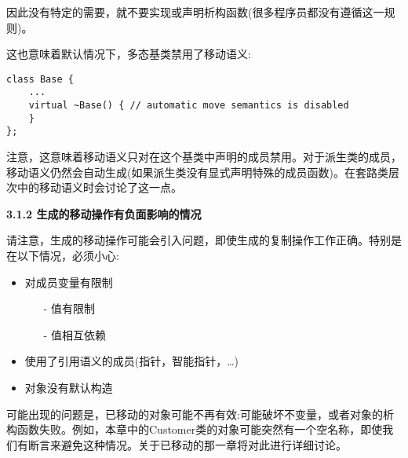 因此没有特定的需要，就不要实现或声明析构函数(很多程序员都没有遵循这一规则)。\par

这也意味着默认情况下，多态基类禁用了移动语义:\par

\begin{lstlisting}[caption={}]
class Base {
	...
	virtual ~Base() { // automatic move semantics is disabled
	}
};
\end{lstlisting}

注意，这意味着移动语义只对在这个基类中声明的成员禁用。对于派生类的成员，移动语义仍然会自动生成(如果派生类没有显式声明特殊的成员函数)。在套路类层次中的移动语义时会讨论了这一点。\par

\hspace*{\fill} \par %
\textbf{3.1.2 生成的移动操作有负面影响的情况}

请注意，生成的移动操作可能会引入问题，即使生成的复制操作工作正确。特别是在以下情况，必须小心:\par

\begin{itemize}
	\item 对成员变量有限制
	\begin{itemize}
		\item[-] 值有限制
		\item[-] 值相互依赖
	\end{itemize}
	\item 使用了引用语义的成员(指针，智能指针，…)
	\item 对象没有默认构造
\end{itemize}

可能出现的问题是，已移动的对象可能不再有效:可能破坏不变量，或者对象的析构函数失败。例如，本章中的Customer类的对象可能突然有一个空名称，即使我们有断言来避免这种情况。关于已移动的那一章将对此进行详细讨论。\par











